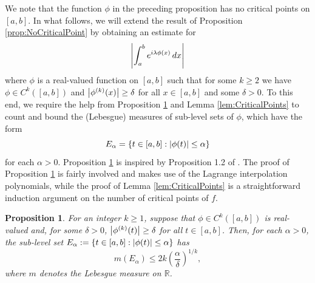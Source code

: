 \documentclass[11pt, letter]{book}
\newtheorem{proposition}[theorem]{Proposition}
\newcommand{\lp}{\left(}
\newcommand{\rp}{\right)}
\newcommand{\f}[2]{\frac{#1}{#2}}
\newcommand{\al}{\alpha}
\begin{document}
\noindent We note that the function $\phi$ in the preceding proposition has no critical points on $[a,b]$. In what follows, we will extend the result of Proposition \ref{prop:NoCriticalPoint} by obtaining an estimate for 
\begin{equation*}
    \abs{\int^b_a e^{i\lambda \phi(x)}\,dx}
\end{equation*}
where $\phi$ is a real-valued function on $[a,b]$ such that for some $k\geq 2$ we have $\phi \in C^k([a,b])$ and $\abs{\phi^{(k)}(x)} \geq \delta$ for all $x\in [a,b]$ and some $\delta > 0$. To this end, we require the help from Proposition \ref{prop:SublevelSetEstimate} and Lemma \ref{lem:CriticalPoints} to count and bound the (Lebesgue) measures of sub-level sets of $\phi$, which have the form
\begin{equation*}
    E_\al = \{ t\in [a,b] : \abs{\phi(t)} \leq \al\}
\end{equation*}
for each $\al > 0$. Proposition \ref{prop:SublevelSetEstimate} is inspired by Proposition 1.2 of \cite{phd_thesis}. The proof of Proposition \ref{prop:SublevelSetEstimate} is fairly involved and makes use of the Lagrange interpolation polynomials, while the proof of Lemma \ref{lem:CriticalPoints} is a straightforward induction argument on the number of critical points of $f$. 

\begin{framed}
\begin{proposition}\label{prop:SublevelSetEstimate} 
For an integer $k\geq 1$, suppose that $\phi\in C^k([a,b])$ is real-valued and, for some $\delta>0$, $\abs{\phi^{(k)}(t)} \geq \delta$ for all $t \in [a,b]$. Then, for each $\alpha>0$, the sub-level set $E_\al := \{ t \in[a,b] : \abs{\phi(t)} \leq \al \}$ has
\begin{equation*}
    m(E_\al) \leq 2 k \lp \f{\al}{\delta} \rp^{1/k},
\end{equation*}
where $m$ denotes the Lebesgue measure on $\mathbb{R}$.
\end{proposition}
\end{framed}
\end{document}

